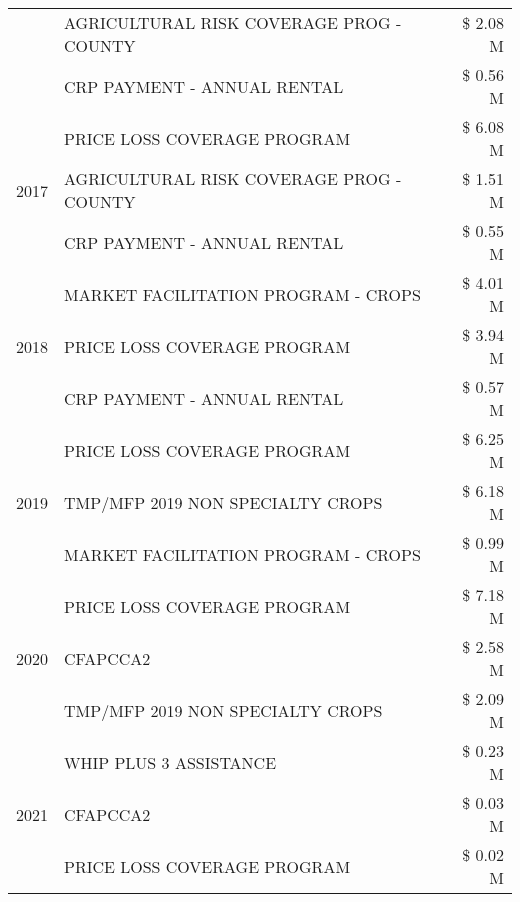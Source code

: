 \begin{tabular}{llr}
 & AGRICULTURAL RISK COVERAGE PROG - COUNTY      & \$ 2.08 M \\
 & CRP PAYMENT - ANNUAL RENTAL                   & \$ 0.56 M \\
\cline{1-3}
\multirow[t]{3}{*}{2017} & PRICE LOSS COVERAGE PROGRAM & \$ 6.08 M \\
 & AGRICULTURAL RISK COVERAGE PROG - COUNTY & \$ 1.51 M \\
 & CRP PAYMENT - ANNUAL RENTAL & \$ 0.55 M \\
\cline{1-3}
\multirow[t]{3}{*}{2018} & MARKET FACILITATION PROGRAM - CROPS & \$ 4.01 M \\
 & PRICE LOSS COVERAGE PROGRAM & \$ 3.94 M \\
 & CRP PAYMENT - ANNUAL RENTAL & \$ 0.57 M \\
\cline{1-3}
\multirow[t]{3}{*}{2019} & PRICE LOSS COVERAGE PROGRAM & \$ 6.25 M \\
 & TMP/MFP 2019 NON SPECIALTY CROPS & \$ 6.18 M \\
 & MARKET FACILITATION PROGRAM - CROPS & \$ 0.99 M \\
\cline{1-3}
\multirow[t]{3}{*}{2020} & PRICE LOSS COVERAGE PROGRAM & \$ 7.18 M \\
 & CFAPCCA2 & \$ 2.58 M \\
 & TMP/MFP 2019 NON SPECIALTY CROPS & \$ 2.09 M \\
\cline{1-3}
\multirow[t]{3}{*}{2021} & WHIP PLUS 3 ASSISTANCE & \$ 0.23 M \\
 & CFAPCCA2 & \$ 0.03 M \\
 & PRICE LOSS COVERAGE PROGRAM & \$ 0.02 M \\
\cline{1-3}
\bottomrule
\end{tabular}
